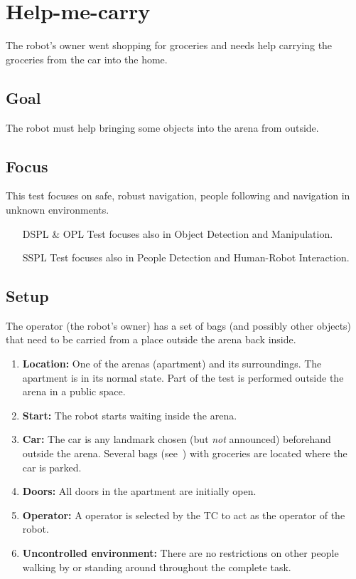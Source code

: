 \section{Help-me-carry}
The robot's owner went shopping for groceries and needs help carrying the groceries from the car into the home.

\subsection{Goal}
The robot must help bringing some objects into the arena from outside.

\subsection{Focus}
This test focuses on safe, robust navigation, people following and navigation in unknown environments.

\begin{itemize}[leftmargin=3cm]
  \item[DSPL \& OPL] Test focuses also in Object Detection and Manipulation.
  \item[SSPL] Test focuses also in People Detection and Human-Robot Interaction.
\end{itemize}

\subsection{Setup}
The operator (the robot's owner) has a set of bags (and possibly other objects) that need to be carried from a place outside the arena back inside.

\begin{enumerate}
  \item \textbf{Location:} One of the arenas (apartment) and its surroundings. The apartment is in its normal state. Part of the test is performed outside the arena in a public space.
  \item \textbf{Start:} The robot starts waiting inside the arena.
  \item \textbf{Car:} The car is any landmark chosen (but \emph{not} announced) beforehand outside the arena. Several bags (see~) with groceries are located where the car is parked.
  \item \textbf{Doors:} All doors in the apartment are initially open.
  \item \textbf{Operator:} A  operator is selected by the TC to act as the operator of the robot.
  \item \textbf{Uncontrolled environment:} There are no restrictions on other people walking by or standing around throughout the complete task.
\end{enumerate}

